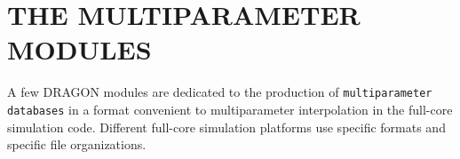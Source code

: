 \section{THE MULTIPARAMETER MODULES}\label{sect:MPOModuleInput}

A few DRAGON modules are dedicated to the production of {\tt multiparameter databases} in a format convenient to
multiparameter interpolation in the full-core simulation code. Different full-core simulation platforms use specific
formats and specific file organizations.


